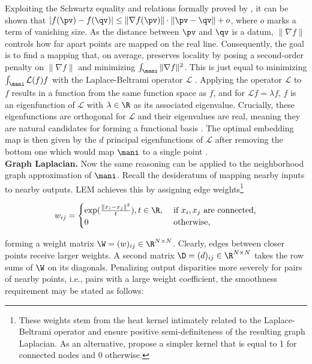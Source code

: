 \vspace{0.5cm}

Exploiting the Schwartz equality and relations formally proved by
\citet{belkinniyogi2008}, it
can be shown that
$|f(\pv) - f(\qv)| \leq \| \nabla f(\pv) \| \cdot \| \pv - \qv\| + o$, where
$o$ marks a term of vanishing size.
As the distance between $\pv$ and $\qv$ is a datum,
$\| \nabla f \|$ controls how far apart points are mapped on the real line.
Consequently, the goal is to find a mapping that, on average, preserves
locality by posing a second-order penalty on $\| \nabla f \|$ and minimizing $\int_{\mani}\| \nabla f \|^2$.
This is just equal to minimizing $\int_{\mani} \mathcal{L}(f)f$ with the
Laplace-Beltrami operator $\mathcal{L}$ \citep{belkinniyogi2003}.
Applying the operator $\mathcal{L}$ to $f$ results in a function from the
same function space as $f$, and for $\mathcal{L} f = \lambda f$, $f$ is an
eigenfunction of $\mathcal{L}$ with $\lambda \in \R$ as its associated
eigenvalue.
Crucially, these eigenfunctions are orthogonal for $\mathcal{L}$ and their
eigenvalues are real, meaning they are natural candidates for forming a
functional basis \citep{levy2006}.
The optimal embedding map is then given by the $d$ principal eigenfunctions of
$\mathcal{L}$ after removing the bottom one which would map $\mani$ to a
single point \citep{belkinniyogi2003}.
\\

\textbf{Graph Laplacian.}
Now the same reasoning can be applied to the neighborhood graph approximation of
$\mani$.
Recall the desideratum of mapping nearby inputs to nearby 
outputs.
LEM achieves this by assigning edge weights\footnote{
These weights stem from the heat kernel intimately related to the 
Laplace-Beltrami operator and ensure positive semi-definiteness of the resulting
graph Laplacian. 
As an alternative, \citet{belkinniyogi2003} propose a simpler kernel that is 
equal to 1 for connected nodes and 0 otherwise.
}

\begin{equation*}
  w_{ij} = \begin{cases}
    \exp(\frac{\|x_i - x_j \|^2}{t}), t \in \R, & \mbox{ if } x_i, x_j
    \text{ are connected,} \\
    0 & \mbox{ otherwise,}
  \end{cases}
\end{equation*}

forming a weight matrix $\W = (w)_{ij} \in \R^{N \times N}$.
Clearly, edges between closer points receive larger weights.
A second matrix $\D = (d)_{ij} \in \R^{N \times N}$ takes the row
sums of $\W$ on its diagonals.
Penalizing output disparities more severely for pairs of nearby points, i.e.,
pairs with a large weight coefficient, the smoothness requirement may be stated
as follows:


